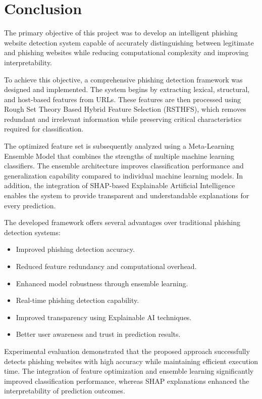 \documentclass[12pt]{report}
\begin{document}
\section{Conclusion}

The primary objective of this project was to develop an intelligent phishing website detection system capable of accurately distinguishing between legitimate and phishing websites while reducing computational complexity and improving interpretability.

To achieve this objective, a comprehensive phishing detection framework was designed and implemented. The system begins by extracting lexical, structural, and host-based features from URLs. These features are then processed using Rough Set Theory Based Hybrid Feature Selection (RSTHFS), which removes redundant and irrelevant information while preserving critical characteristics required for classification.

The optimized feature set is subsequently analyzed using a Meta-Learning Ensemble Model that combines the strengths of multiple machine learning classifiers. The ensemble architecture improves classification performance and generalization capability compared to individual machine learning models. In addition, the integration of SHAP-based Explainable Artificial Intelligence enables the system to provide transparent and understandable explanations for every prediction.

The developed framework offers several advantages over traditional phishing detection systems:

\begin{itemize}
    \item Improved phishing detection accuracy.
    \item Reduced feature redundancy and computational overhead.
    \item Enhanced model robustness through ensemble learning.
    \item Real-time phishing detection capability.
    \item Improved transparency using Explainable AI techniques.
    \item Better user awareness and trust in prediction results.
\end{itemize}

Experimental evaluation demonstrated that the proposed approach successfully detects phishing websites with high accuracy while maintaining efficient execution time. The integration of feature optimization and ensemble learning significantly improved classification performance, whereas SHAP explanations enhanced the interpretability of prediction outcomes.
\end{document}
